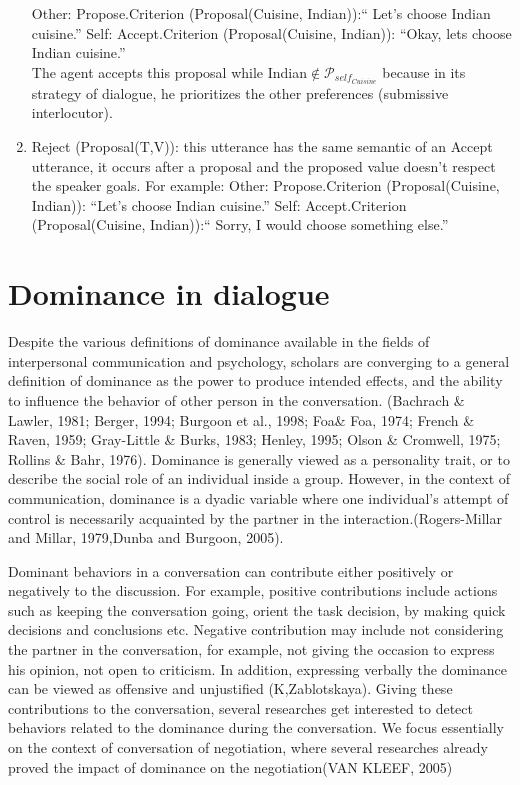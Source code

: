 \documentclass{llncs}
\begin{document}
\begin{enumerate}
		\subitem Other: Propose.Criterion (Proposal(Cuisine, Indian)):`` Let's choose Indian cuisine.''
		\subitem Self: Accept.Criterion (Proposal(Cuisine, Indian)): ``Okay, lets choose Indian cuisine.''
		\\The agent accepts this proposal while Indian$\notin \mathcal{P}_{self_{Cuisine}}$ because in its strategy of dialogue, he prioritizes the other preferences (submissive interlocutor).
	\\	
	\item Reject (Proposal(T,V)): this utterance has the same semantic of an Accept utterance, it occurs after a proposal and the proposed value doesn't respect the speaker goals. For example: 
		\subitem Other: Propose.Criterion (Proposal(Cuisine, Indian)): ``Let's choose Indian cuisine.'' 
		\subitem Self: Accept.Criterion (Proposal(Cuisine, Indian)):`` Sorry, I would choose something else.'' 
	\\
	
\end{enumerate}
 
 \section{Dominance in dialogue}
\par Despite the various definitions of dominance available in the fields of interpersonal communication and psychology, scholars are converging to a general definition of dominance as the power to produce intended effects, and the ability to influence the behavior of other person in the conversation. (Bachrach \& Lawler, 1981; Berger, 1994; Burgoon et al.,
1998; Foa\& Foa, 1974; French \& Raven, 1959; Gray-Little \& Burks, 1983;
Henley, 1995; Olson \& Cromwell, 1975; Rollins \& Bahr, 1976). Dominance is generally viewed as a personality trait, or to describe the social role of an individual inside a group. However, in the context of communication, dominance is a dyadic variable where one individual's attempt of control is necessarily acquainted by the partner in the interaction.(Rogers-Millar and Millar, 1979,Dunba and Burgoon, 2005). 
\par Dominant behaviors in a conversation can contribute either positively or negatively to the discussion. For example, positive contributions include actions such as keeping the conversation going, orient the task decision, by making quick decisions and conclusions etc. Negative contribution may include not considering the partner in the conversation, for example, not giving the occasion to express his opinion, not open to criticism. In addition, expressing verbally the dominance can be viewed as offensive and unjustified (K,Zablotskaya). Giving these contributions to the conversation, several researches get interested to detect  behaviors related to the dominance during the conversation. We focus essentially on the context of conversation of negotiation, where several researches already proved the impact of dominance on the negotiation(VAN KLEEF, 2005)
\end{document}
